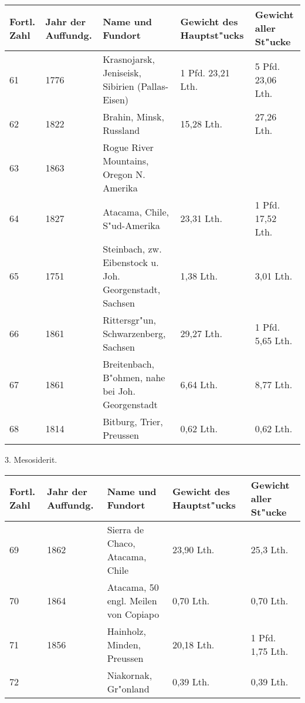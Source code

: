 \documentclass[a4paper, 11pt, oneside, german]{article}
\begin{document}
\begin{center}
\begin{footnotesize}
\begin{tabular}{ |p{7mm}|p{9mm}|p{55mm}|p{24mm}|p{24mm}| }
    \hline
    Fortl. Zahl & Jahr der Auffundg. & Name und Fundort & Gewicht des Hauptst"ucks & Gewicht aller St"ucke\\
    \hline\hline
    61 & 1776 & Krasnojarsk, Jeniseisk, Sibirien (Pallas-Eisen) & 1 Pfd. 23,21 Lth. & 5 Pfd. 23,06 Lth.\\\hline
    62 & 1822 & Brahin, Minsk, Russland & 15,28 Lth. & 27,26 Lth.\\\hline
    63 & 1863 & Rogue River Mountains, Oregon N. Amerika &  & \\\hline
    64 & 1827 & Atacama, Chile, S"ud-Amerika & 23,31 Lth. & 1 Pfd. 17,52 Lth.\\\hline
    65 & 1751 & Steinbach, zw. Eibenstock u. Joh. Georgenstadt, Sachsen & 1,38 Lth. & 3,01 Lth.\\\hline
    66 & 1861 & Rittersgr"un, Schwarzenberg, Sachsen & 29,27 Lth. & 1 Pfd. 5,65 Lth.\\\hline
    67 & 1861 & Breitenbach, B"ohmen, nahe bei Joh. Georgenstadt & 6,64 Lth. & 8,77 Lth.\\\hline
    68 & 1814 & Bitburg, Trier, Preussen & 0,62 Lth. & 0,62 Lth.\\
    \hline
\end{tabular}
\end{footnotesize}
\end{center}
\begin{center}
3. Mesosiderit.
\end{center}
\begin{center}
\begin{footnotesize}
\begin{tabular}{ |p{7mm}|p{9mm}|p{55mm}|p{24mm}|p{24mm}| }
    \hline
    Fortl. Zahl & Jahr der Auffundg. & Name und Fundort & Gewicht des Hauptst"ucks & Gewicht aller St"ucke\\
    \hline\hline
    69 & 1862 & Sierra de Chaco, Atacama, Chile & 23,90 Lth. & 25,3 Lth.\\\hline
    70 & 1864 & Atacama, 50 engl. Meilen von Copiapo & 0,70 Lth. & 0,70 Lth.\\\hline
    71 & 1856 & Hainholz, Minden, Preussen & 20,18 Lth. & 1 Pfd. 1,75 Lth.\\\hline
    72 &  & Niakornak, Gr"onland & 0,39 Lth. & 0,39 Lth.\\
    \hline
\end{tabular}
\end{footnotesize}
\end{center}
\end{document}
